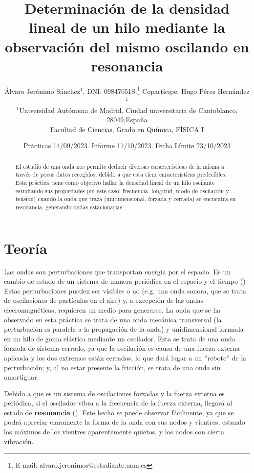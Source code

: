 \documentclass[fleqn,usenatbib,openbib]{mnras}
\title[Ondas Estacionarias]{Determinación de la densidad lineal de un hilo mediante la observación del mismo oscilando en resonancia}
\author[Álvaro Jerónimo Sánchez]{
Álvaro Jerónimo Sánchez$^{1}$, DNI: 09847051S.\thanks{E-mail: alvaro.jeronimos@estudiante.uam.es}
Copartícipe: Hugo Pérez Hernández$^{1}$
\\
$^{1}$Universidad Autónoma de Madrid, Ciudad universitaria de Cantoblanco, 28049,España \\
Facultad de Ciencias, Grado en Química, FÍSICA I
}
\date{Prácticas 14/09/2023. Informe 17/10/2023. Fecha Límite 23/10/2023}
\begin{document}
\label{firstpage}
\pagerange{\pageref{firstpage}--\pageref{lastpage}}
\maketitle


\begin{abstract}

El estudio de una onda nos permite deducir diversas características de la misma a través de pocos datos recogidos, debido a que esta tiene características predecibles. Esta práctica tiene como objetivo hallar la densidad lineal de un hilo oscilante estudiando sus propiedades (en este caso: frecuencia, longitud, modo de oscilación y tensión) cuando la onda que traza (unidimensional, forzada y cerrada) se encuentra en resonancia, generando ondas estacionarias.
\vspace{1cm}
\end{abstract}

\section{Teoría}

Las ondas son perturbaciones que transportan energía por el espacio. Es un cambio de estado de un sistema de manera periódica en el espacio y el tiempo (\cite{2002Hop}) Estas perturbaciones pueden ser visibles o no (e.g. una onda sonora, que se trata de oscilaciones de partículas en el aire) y, a excepción de las ondas elecromagnéticas, requieren un medio para generarse. La onda que se ha observado en esta práctica se trata de una onda mecánica transversal (la perturbación es paralela a la propagación de la onda) y unidimensional formada en un hilo de goma elástica mediante un oscilador. Esta se trata de una onda forzada de sistema cerrado, ya que la oscilación es causa de una fuerza externa aplicada y los dos extremos están cerrados, lo que dará lugar a un ''rebote'' de la perturbación; y, al no estar presente la fricción, se trata de una onda sin amortiguar.

Debido a que es un sistema de oscilaciones forzadas y la fuerza externa es periódica, si el oscilador vibra a la frecuencia de la fuerza externa, llegará al estado de \textbf{resonancia} (\cite{2002Hop}). Este hecho se puede observar fácilmente, ya que se podrá apreciar claramente la forma de la onda con sus nodos y vientres, estando los máximos de los vientres aparentemente quietos, y los nodos con cierta vibración.
\end{document}
